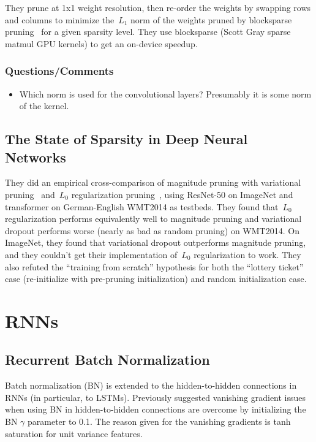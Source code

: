 \documentclass[a4paper, 12pt]{article}
\begin{document}
They prune at 1x1 weight resolution, then re-order the weights by swapping rows
and columns to minimize the~$L_1$ norm of the weights pruned by blocksparse
pruning~\cite{wen2016learning} for a given sparsity level. They use blocksparse
(Scott Gray sparse matmul GPU kernels) to get an on-device speedup.

\subsubsection{Questions/Comments}

\begin{itemize}
        \item Which norm is used for the convolutional layers? Presumably it is
                some norm of the kernel.
\end{itemize}


\subsection{The State of Sparsity in Deep Neural
            Networks~\cite{gale2019thestate}}

They did an empirical cross-comparison of magnitude pruning with variational
pruning~\cite{molchanov2017variational} and~$L_0$ regularization
pruning~\cite{louizos2018learning}, using ResNet-50 on ImageNet and transformer
on German-English WMT2014 as testbeds.
They found that~$L_0$ regularization performs equivalently well to magnitude
pruning and variational dropout performs worse (nearly as bad as random
pruning) on WMT2014.
On ImageNet, they found that variational dropout outperforms magnitude pruning,
and they couldn't get their implementation of~$L_0$ regularization to work.
They also refuted the ``training from scratch'' hypothesis for both the
``lottery ticket'' case (re-initialize with pre-pruning initialization) and
random initialization case.


\section{RNNs}

\subsection{Recurrent Batch
            Normalization~\citet{DBLP:journals/corr/CooijmansBLC16}}

Batch normalization (BN) is extended to the hidden-to-hidden connections in
RNNs (in particular, to LSTMs). Previously suggested vanishing gradient issues
when using BN in hidden-to-hidden connections are overcome by initializing the
BN $\gamma$ parameter to 0.1. The reason given for the vanishing gradients is
tanh saturation for unit variance features.
\end{document}
